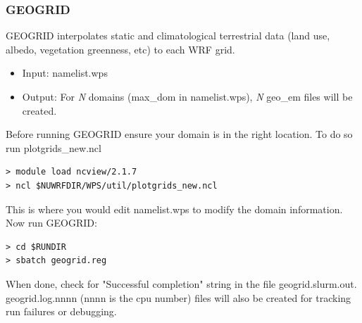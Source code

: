 \begin{frame}[fragile]\frametitle{GEOGRID}

\scriptsize{
GEOGRID interpolates static and climatological terrestrial data (land use, albedo, vegetation greenness, etc) to each WRF grid.
\begin{itemize}
\item Input: namelist.wps
\item Output: For \emph{N} domains (max\_dom in namelist.wps), \emph{N} geo\_em files will be created.
\end{itemize}\scriptsize}    
\hrulefill\par
\scriptsize{Before running GEOGRID ensure your domain is in the right location. To do so run plotgrids\_new.ncl}
\verbatimfont{\scriptsize}%
\begin{verbatim}
> module load ncview/2.1.7
> ncl $NUWRFDIR/WPS/util/plotgrids_new.ncl
\end{verbatim}
\scriptsize{This is where you would edit namelist.wps to modify the domain information.
Now run GEOGRID:}
\verbatimfont{\scriptsize}%
\begin{verbatim}
> cd $RUNDIR
> sbatch geogrid.reg
\end{verbatim}
When done, check for  "Successful completion"  string in the file geogrid.slurm.out.
geogrid.log.nnnn (nnnn is the cpu number) files will also be created for tracking run failures or debugging.

\end{frame}

